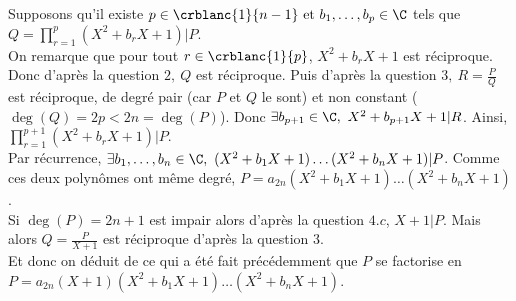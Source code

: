 \documentclass{book}
\begin{document}
\begin{enumerate}[leftmargin=*]
		Supposons qu'il existe $p\in \crblanc{1}{n-1}\text{ et }b_1,\dots,b_p\in \C$ tels que $Q=\displaystyle\prod\limits_{r=1}^p{(X^2+b_rX+1)}|P$.\\
		On remarque que pour tout $r\in \crblanc{1}{p}$, $X^2+b_rX+1$ est réciproque. Donc d'après la question $2,\ Q$ est réciproque. Puis d'après la question $3,\ R=\displaystyle\frac{P}{Q}$ est réciproque, de degré pair (car $P$ et $Q$ le sont) et non constant ($\deg(Q)=2p<2n=\deg(P)$). Donc $\exists b_{p+1}\in \C,\ X^2+b_{p+1}X+1|R$.
		Ainsi, $\displaystyle\prod\limits_{r=1}^{p+1}{(X^2+b_rX+1)}|P$.\\
		Par récurrence, $\exists b_1,\dots,b_n\in \C,\ (X^2+b_1X+1)\dots(X^2+b_nX+1)|P$. Comme ces deux polynômes ont même degré, $P=a_{2n}(X^2+b_1X+1)\dots(X^2+b_nX+1)$.\\
		Si $\deg(P)=2n+1$ est impair alors d'après la question $4.c$, $X+1|P$. Mais alors $Q=\displaystyle\frac{P}{X+1}$ est réciproque d'après la question $3$.\\
		Et donc on déduit de ce qui a été fait précédemment que $P$ se factorise en $P=a_{2n}(X+1)(X^2+b_1X+1)\dots(X^2+b_nX+1)$.
	\end{enumerate}
	
\end{document}
